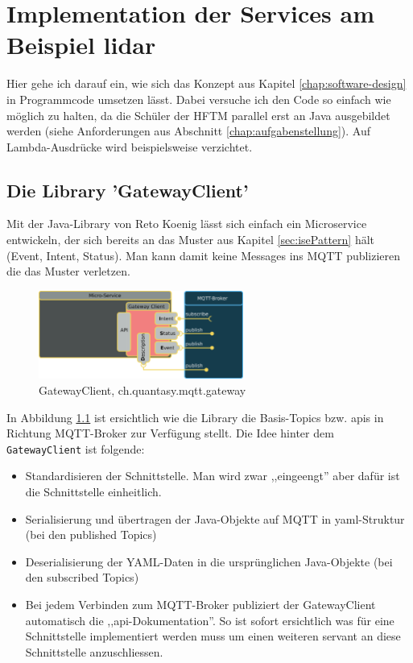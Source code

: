 \chapter{Implementation der Services am Beispiel \acrshort{lidar}}
Hier gehe ich darauf ein, wie sich das Konzept aus Kapitel \ref{chap:software-design} in Programmcode umsetzen lässt. Dabei versuche ich den Code so einfach wie möglich zu halten, da die Schüler der HFTM parallel erst an Java ausgebildet werden (siehe Anforderungen aus Abschnitt \ref{chap:aufgabenstellung}). Auf Lambda-Ausdrücke wird beispielsweise verzichtet.
\label{chap:beispielimplementation}
\section{Die Library 'GatewayClient'}
Mit der  Java-Library  von Reto Koenig \cite{ch.quantasy.mqtt.gateway} lässt sich einfach ein Microservice entwickeln, der sich bereits an das Muster aus Kapitel \ref{sec:isePattern} hält (Event, Intent, Status). Man kann damit keine Messages ins MQTT publizieren die das Muster verletzen.
\begin{figure}[H]
	\centering
	\includegraphics[width=0.6\textwidth]{img/gatewayclient.png}
	\caption{GatewayClient, ch.quantasy.mqtt.gateway\cite{ch.quantasy.mqtt.gateway}}
	\label{fig:gatewayclient}
\end{figure}
In Abbildung \ref{fig:gatewayclient} ist ersichtlich wie die Library die Basis-Topics bzw. \acrshort{api}s in Richtung MQTT-Broker zur Verfügung stellt. Die Idee hinter dem \verb|GatewayClient| ist folgende:
\begin{itemize}
	\item
	Standardisieren der Schnittstelle. Man wird zwar ,,eingeengt'' aber dafür ist die Schnittstelle einheitlich.
	\item
	Serialisierung und übertragen der Java-Objekte auf MQTT in \acrshort{yaml}-Struktur (bei den published Topics)
	\item
	Deserialisierung der YAML-Daten in die ursprünglichen Java-Objekte (bei den subscribed Topics)
	\item
	Bei jedem Verbinden zum MQTT-Broker publiziert der GatewayClient automatisch die ,,\acrshort{api}-Dokumentation''. So ist sofort ersichtlich was für eine Schnittstelle implementiert werden muss um einen weiteren \Gls{servant} an diese Schnittstelle anzuschliessen.
\end{itemize}
